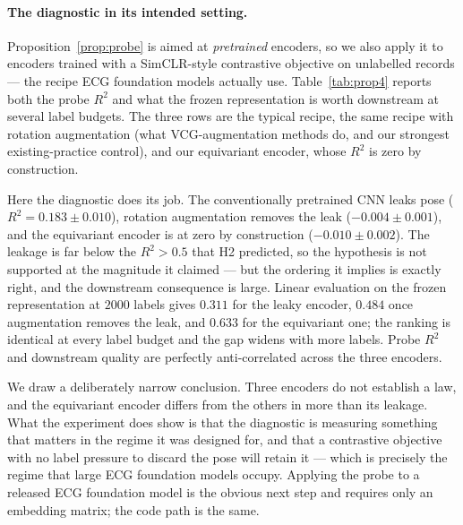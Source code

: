 \documentclass[11pt]{article}
\theoremstyle{definition}
\begin{document}
\paragraph{The diagnostic in its intended setting.} Proposition~\ref{prop:probe} is
aimed at \emph{pretrained} encoders, so we also apply it to encoders trained with a
SimCLR-style contrastive objective on unlabelled records --- the recipe ECG foundation
models actually use. Table~\ref{tab:prop4} reports both the probe $R^2$ and what the
frozen representation is worth downstream at several label budgets. The three rows are
the typical recipe, the same recipe with rotation augmentation (what
VCG-augmentation methods do, and our strongest existing-practice control), and our
equivariant encoder, whose $R^2$ is zero by construction.

\begin{table}[t]\centering
\caption{Nuisance leakage and downstream value of self-supervised representations.}
\label{tab:prop4}

\end{table}

Here the diagnostic does its job. The conventionally pretrained CNN leaks pose
($R^2 = 0.183 \pm 0.010$), rotation augmentation removes the leak
($-0.004 \pm 0.001$), and the equivariant encoder is at zero by construction
($-0.010 \pm 0.002$). The leakage is far below the $R^2 > 0.5$ that H2 predicted, so
the hypothesis is not supported at the magnitude it claimed --- but the ordering it
implies is exactly right, and the downstream consequence is large. Linear evaluation on
the frozen representation at $2000$ labels gives $0.311$ for the leaky encoder, $0.484$
once augmentation removes the leak, and $0.633$ for the equivariant one; the ranking is
identical at every label budget and the gap widens with more labels. Probe $R^2$ and
downstream quality are perfectly anti-correlated across the three encoders.

We draw a deliberately narrow conclusion. Three encoders do not establish a law, and
the equivariant encoder differs from the others in more than its leakage. What the
experiment does show is that the diagnostic is measuring something that matters in the
regime it was designed for, and that a contrastive objective with no label pressure to
discard the pose will retain it --- which is precisely the regime that large ECG
foundation models occupy. Applying the probe to a released ECG foundation model is the
obvious next step and requires only an embedding matrix; the code path is the same.
\end{document}
